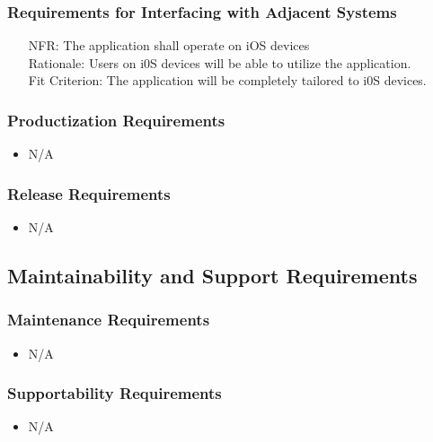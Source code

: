 \documentclass[12pt]{article}
\newcounter{nfrnum} %
\begin{document}
  \subsubsection{Requirements for Interfacing with Adjacent Systems}
    \noindent\begin{itemize}
      \item[NFR\refstepcounter{nfrnum}\thenfrnum:] 
        The application shall operate on iOS devices 
		\\ Rationale: Users on i0S devices will be able to utilize the application.
		\\ Fit Criterion: The application will be completely tailored to i0S devices.
    \end{itemize}  
  \subsubsection{Productization Requirements}
    \noindent\begin{itemize}
		\item N/A
    \end{itemize} 
  \subsubsection{Release Requirements}
    \noindent\begin{itemize}
		\item N/A
    \end{itemize}  

\subsection{Maintainability and Support Requirements}
  \subsubsection{Maintenance Requirements}
    \noindent \begin{itemize}
		\item N/A
    \end{itemize}
  \subsubsection{Supportability Requirements}
    \noindent \begin{itemize}
      \item N/A
    \end{itemize}
\end{document}
